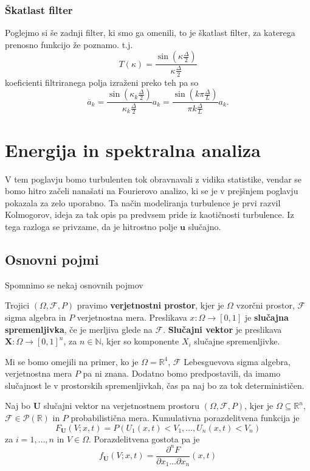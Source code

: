 \documentclass[mat2, tisk]{fmfdelo}
\newcommand{\R}{\mathbb R}
\newcommand{\N}{\mathbb N}
\newcommand{\bd}{\textbf}
\begin{document}
\subsubsection{Škatlast filter}
Poglejmo si še zadnji filter, ki smo ga omenili, to je 
škatlast filter, za katerega prenosno funkcijo že poznamo. t.j.
$$
T(\kappa) = \frac{\sin(\kappa \frac{\Delta}{2})}{\kappa \frac{\Delta}{2}}
$$
koeficienti filtriranega polja izraženi preko teh pa so 
$$
\overline{a}_k = \frac{\sin(\kappa_k \frac{\Delta}{2})}{\kappa_k \frac{\Delta}{2}} a_k = \frac{\sin(k\pi\frac{\Delta}{L})}{\pi k\frac{\Delta}{L}} a_k .
$$


\section{Energija in spektralna analiza}

V tem poglavju bomo turbulenten tok obravnavali z vidika statistike, 
vendar se bomo hitro začeli nanašati na Fourierovo analizo, ki 
se je v prejšnjem poglavju pokazala za zelo uporabno. Ta način 
modeliranja turbulence je prvi razvil Kolmogorov, ideja za tak 
opis pa predvsem pride iz kaotičnosti turbulence. Iz tega razloga se 
privzame, da je hitrostno polje $\bd{u}$ slučajno. 

\subsection{Osnovni pojmi}

Spomnimo se nekaj osnovnih pojmov

\begin{definicija}
Trojici $(\Omega, \mathcal{F}, P)$ pravimo \textbf{verjetnostni prostor}, 
kjer je $\Omega$ vzorčni prostor, $\mathcal{F}$ sigma algebra in 
$P$ verjetnostna mera. Preslikava $x: \Omega \rightarrow [0, 1]$ 
je \textbf{slučajna spremenljivka}, če je merljiva glede na $\mathcal{F}$. 
\textbf{Slučajni vektor} je preslikava $\bd{X}: \Omega \rightarrow [0, 1]^n$, 
za $n\in \N$, kjer so komponente $X_i$ slučajne spremenljivke.
\end{definicija}

Mi se bomo omejili na primer, ko je $\Omega = \R^4$, $\mathcal{F}$ 
Lebesguevova sigma algebra, verjetnostna mera $P$ pa ni znana. 
Dodatno bomo predpostavili, da imamo slučajnost le v prostorskih 
spremenljivkah, čas pa naj bo za tok determinističen. 

\begin{definicija}
Naj bo $\bd{U}$ slučajni vektor na verjetnostnem prostoru $(\Omega, \mathcal{F}, P)$,
kjer je $\Omega \subseteq \R^n$, $\mathcal{F} \in \mathcal{P}(\R)$ in $P$ probabilistična mera.
Kumulativna porazdelitvena funkcija je
\begin{equation}
F_\bd{U}(V; x, t) = P(U_1(x, t) < V_1, \dots, U_n(x, t) < V_n)
\end{equation}
za $i = 1, \dots, n$ in $V \in \Omega$. Porazdelitvena 
gostota pa je 
\begin{equation}
f_\bd{U}(V; x, t) = \frac{\partial^n F}{\partial x_1 \dots \partial x_n}(x, t)
\end{equation}
\end{definicija}
\end{document}
